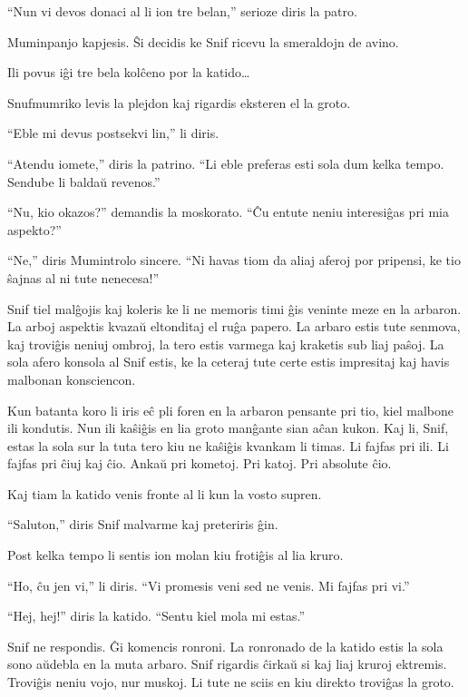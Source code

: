 ``Nun vi devos donaci al li ion tre belan,'' serioze diris la patro.

Muminpanjo kapjesis. Ŝi decidis ke Snif ricevu la smeraldojn de avino.

Ili povus iĝi tre bela kolĉeno por la katido{\ldots}

Snufmumriko levis la plejdon kaj rigardis eksteren el la groto.

``Eble mi devus postsekvi lin,'' li diris.

``Atendu iomete,'' diris la patrino. ``Li eble preferas esti sola dum kelka tempo. Sendube li baldaŭ revenos.''

``Nu, kio okazos?'' demandis la moskorato. ``Ĉu entute neniu interesiĝas pri mia aspekto?''

``Ne,'' diris Mumintrolo sincere. ``Ni havas tiom da aliaj aferoj por pripensi, ke tio ŝajnas al ni tute nenecesa!''

\sectionbreak

Snif tiel malĝojis kaj koleris ke li ne memoris timi ĝis veninte meze en la arbaron. La arboj aspektis kvazaŭ eltonditaj el ruĝa papero. La arbaro estis tute senmova, kaj troviĝis neniuj ombroj, la tero estis varmega kaj kraketis sub liaj paŝoj. La sola afero konsola al Snif estis, ke la ceteraj tute certe estis impresitaj kaj havis malbonan konsciencon.

Kun batanta koro li iris eĉ pli foren en la arbaron pensante pri tio, kiel malbone ili kondutis. Nun ili kaŝiĝis en lia groto manĝante sian aĉan kukon. Kaj li, Snif, estas la sola sur la tuta tero kiu ne kaŝiĝis kvankam li timas. Li fajfas pri ili. Li fajfas pri ĉiuj kaj ĉio. Ankaŭ pri kometoj. Pri katoj. Pri absolute ĉio.

Kaj tiam la katido venis fronte al li kun la vosto supren.

``Saluton,'' diris Snif malvarme kaj preteriris ĝin.

Post kelka tempo li sentis ion molan kiu frotiĝis al lia kruro.

``Ho, ĉu jen vi,'' li diris. ``Vi promesis veni sed ne venis. Mi fajfas pri vi.''

``Hej, hej!'' diris la katido. ``Sentu kiel mola mi estas.''

Snif ne respondis. Ĝi komencis ronroni. La ronronado de la katido estis la sola sono aŭdebla en la muta arbaro. Snif rigardis ĉirkaŭ si kaj liaj kruroj ektremis. Troviĝis neniu vojo, nur muskoj. Li tute ne sciis en kiu direkto troviĝas la groto.

\sectionbreak

